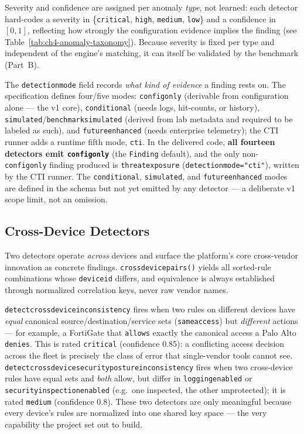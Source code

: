 \documentclass[12pt,a4paper]{report}
\renewcommand{\_}{\textunderscore\allowbreak}
\begin{document}
Severity and confidence are assigned per anomaly \emph{type}, not learned: each detector hard-codes a severity in \{\texttt{critical}, \texttt{high}, \texttt{medium}, \texttt{low}\} and a confidence in $[0,1]$, reflecting how strongly the configuration evidence implies the finding (see Table~\ref{tab:ch4-anomaly-taxonomy}). Because severity is fixed per type and independent of the engine's matching, it can itself be validated by the benchmark (Part~B).

The \texttt{detection\_mode} field records \emph{what kind of evidence} a finding rests on. The specification defines four/five modes: \texttt{config\_only} (derivable from configuration alone --- the v1 core), \texttt{conditional} (needs logs, hit-counts, or history), \texttt{simulated}/\texttt{benchmark\_simulated} (derived from lab metadata and required to be labeled as such), and \texttt{future\_enhanced} (needs enterprise telemetry); the CTI runner adds a runtime fifth mode, \texttt{cti}. In the delivered code, \textbf{all fourteen detectors emit \texttt{config\_only}} (the \texttt{Finding} default), and the only non-\texttt{config\_only} finding produced is \texttt{threat\_exposure} (\texttt{detection\_mode="cti"}), written by the CTI runner. The \texttt{conditional}, \texttt{simulated}, and \texttt{future\_enhanced} modes are defined in the schema but not yet emitted by any detector --- a deliberate v1 scope limit, not an omission.

\subsection{Cross-Device Detectors}
\label{sec:ch4-crossdev}

Two detectors operate \emph{across} devices and surface the platform's core cross-vendor innovation as concrete findings. \texttt{\_cross\_device\_pairs()} yields all sorted-rule combinations whose \texttt{device\_id} differs, and equivalence is always established through normalized correlation keys, never raw vendor names.

\texttt{detect\_cross\_device\_inconsistency} fires when two rules on different devices have \emph{equal} canonical source/destination/service sets (\texttt{\_same\_access}) but \emph{different} actions --- for example, a FortiGate that \texttt{allows} exactly the canonical access a Palo Alto \texttt{denies}. This is rated \texttt{critical} (confidence 0.85): a conflicting access decision across the fleet is precisely the class of error that single-vendor tools cannot see. \texttt{detect\_cross\_device\_security\_posture\_inconsistency} fires when two cross-device rules have equal sets and \emph{both} allow, but differ in \texttt{logging\_enabled} or \texttt{security\_inspection\_enabled} (e.g.\ one inspected, the other unprotected); it is rated \texttt{medium} (confidence 0.8). These two detectors are only meaningful because every device's rules are normalized into one shared key space --- the very capability the project set out to build.
\end{document}
